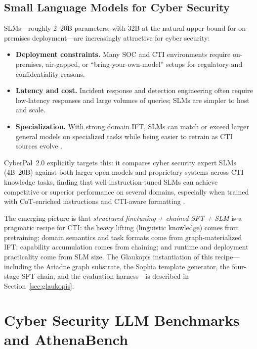\documentclass[unnumsec,webpdf,contemporary,large]{oup-authoring-template}
\theoremstyle{thmstyleone}
\theoremstyle{thmstyletwo}
\theoremstyle{thmstylethree}
\begin{document}
\subsection{Small Language Models for Cyber Security}
\label{sec:ift-slm-cyber}

SLMs---roughly 2--20B parameters, with 32B at the natural upper bound for on-premises deployment---are increasingly attractive for cyber security:

\begin{itemize}
  \item \textbf{Deployment constraints.} Many SOC and CTI environments require on-premises, air-gapped, or ``bring-your-own-model'' setups for regulatory and confidentiality reasons.
  \item \textbf{Latency and cost.} Incident response and detection engineering often require low-latency responses and large volumes of queries; SLMs are simpler to host and scale.
  \item \textbf{Specialization.} With strong domain IFT, SLMs can match or exceed larger general models on specialized tasks while being easier to retrain as CTI sources evolve \cite{levi2025toward}.
\end{itemize}

CyberPal~2.0 explicitly targets this: it compares cyber security expert SLMs (4B--20B) against both larger open models and proprietary systems across CTI knowledge tasks, finding that well-instruction-tuned SLMs can achieve competitive or superior performance on several domains, especially when trained with CoT-enriched instructions and CTI-aware formatting \cite{levi2025toward}.

The emerging picture is that \emph{structured finetuning + chained SFT + SLM} is a pragmatic recipe for CTI: the heavy lifting (linguistic knowledge) comes from pretraining; domain semantics and task formats come from graph-materialized IFT; capability accumulation comes from chaining; and runtime and deployment practicality come from SLM size. The Glaukopis instantiation of this recipe---including the Ariadne graph substrate, the Sophia template generator, the four-stage SFT chain, and the evaluation harness---is described in Section~\ref{sec:glaukopis}.


\section{Cyber Security LLM Benchmarks and AthenaBench}
\label{sec:benchmarks}
\end{document}
